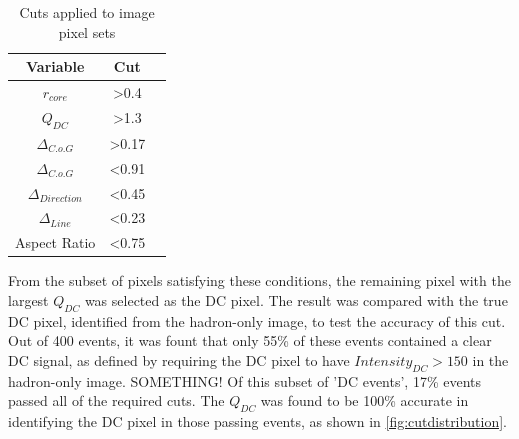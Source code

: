 \documentclass{article}
\begin{document}
\begin{table}[h!]
  \centering
  \caption{Cuts applied to image pixel sets}
  \label{tab:table1}
  \begin{tabular}{ccc}
    \toprule
    Variable & Cut\\
    \midrule
     $r_{core}$ & \textgreater 0.4 \\
     $Q_{DC}$ & \textgreater 1.3 \\
     $ \Delta_{C.o.G}$ & \textgreater 0.17 \\
     $ \Delta_{C.o.G}$ & \textless 0.91 \\
     $\Delta_{Direction}$ & \textless 0.45 \\
     $\Delta_{Line}$ & \textless 0.23 \\
     Aspect Ratio & \textless 0.75 \\
    \bottomrule
  \end{tabular}
\end{table}

From the subset of pixels satisfying these conditions, the remaining pixel with the largest $Q_{DC}$ was selected as the DC pixel. The result was compared with the true DC pixel, identified from the hadron-only image, to test the accuracy of this cut. Out of 400 events, it was fount that only 55\% of these events contained a clear DC signal, as defined by requiring the DC pixel to have $Intensity_{DC} > 150$ in the hadron-only image. SOMETHING! Of this subset of 'DC events', 17\% events passed all of the required cuts. The $Q_{DC}$ was found to be 100\% accurate in identifying the DC pixel in those passing events, as shown in \ref{fig:cutdistribution}.
\end{document}

